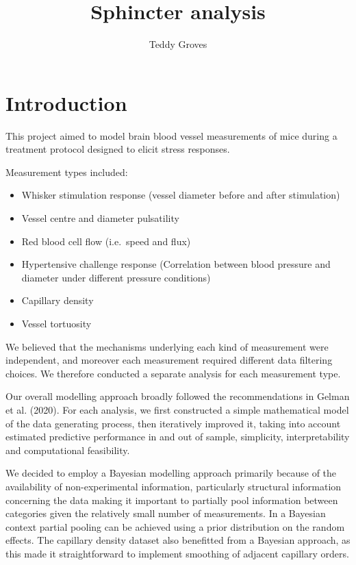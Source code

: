 \documentclass[
  letterpaper,
  DIV=11,
  numbers=noendperiod,
  oneside]{scrartcl}
\title{Sphincter analysis}
\author{Teddy Groves}
\date{}
\providecommand{\tightlist}{%
  \setlength{\itemsep}{0pt}\setlength{\parskip}{0pt}}\usepackage{longtable,booktabs,array}
\renewcommand*\contentsname{Table of contents}
\newcommand\contentsname{Table of contents}
\theoremstyle{plain}
\theoremstyle{remark}
\begin{document}
\maketitle

\renewcommand*\contentsname{Table of contents}
{
\hypersetup{linkcolor=}
\setcounter{tocdepth}{3}
\tableofcontents
}
\section{Introduction}\label{introduction}

This project aimed to model brain blood vessel measurements of mice
during a treatment protocol designed to elicit stress responses.

Measurement types included:

\begin{itemize}
\tightlist
\item
  Whisker stimulation response (vessel diameter before and after
  stimulation)
\item
  Vessel centre and diameter pulsatility
\item
  Red blood cell flow (i.e.~speed and flux)
\item
  Hypertensive challenge response (Correlation between blood pressure
  and diameter under different pressure conditions)
\item
  Capillary density
\item
  Vessel tortuosity
\end{itemize}

We believed that the mechanisms underlying each kind of measurement were
independent, and moreover each measurement required different data
filtering choices. We therefore conducted a separate analysis for each
measurement type.

Our overall modelling approach broadly followed the recommendations in
Gelman et al. (2020). For each analysis, we first constructed a simple
mathematical model of the data generating process, then iteratively
improved it, taking into account estimated predictive performance in and
out of sample, simplicity, interpretability and computational
feasibility.

We decided to employ a Bayesian modelling approach primarily because of
the availability of non-experimental information, particularly
structural information concerning the data making it important to
partially pool information between categories given the relatively small
number of measurements. In a Bayesian context partial pooling can be
achieved using a prior distribution on the random effects. The capillary
density dataset also benefitted from a Bayesian approach, as this made
it straightforward to implement smoothing of adjacent capillary orders.
\end{document}
